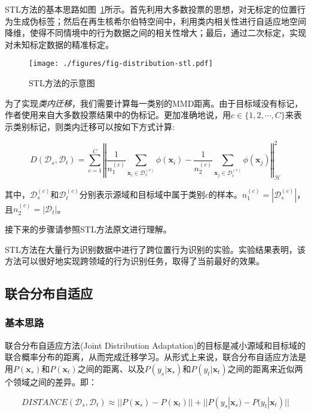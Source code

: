 STL方法的基本思路如图~\ref{fig-distribution-stl}所示。首先利用大多数投票的思想，对无标定的位置行为生成伪标签；然后在再生核希尔伯特空间中，利用类内相关性进行自适应地空间降维，使得不同情境中的行为数据之间的相关性增大；最后，通过二次标定，实现对未知标定数据的精准标定。

\begin{figure}[htbp]
	\centering
	\texttt{[image: ./figures/fig-distribution-stl.pdf]}
	\caption{STL方法的示意图}
	\label{fig-distribution-stl}
\end{figure}

为了实现\textit{类内迁移}，我们需要计算每一类别的MMD距离。由于目标域没有标记，作者使用来自大多数投票结果中的伪标记。更加准确地说，用$c \in \{1, 2, \cdots, C\}$来表示类别标记，则类内迁移可以按如下方式计算:

\begin{equation}
\label{equ-stl-stra}
D(\mathcal{D}_{s},\mathcal{D}_{t})
=\sum_{c=1}^{C}\left \Vert \frac{1}{n^{(c)}_1} \sum_{\mathbf{x}_i \in \mathcal{D}^{(c)}_s} \phi(\mathbf{x}_i) - \frac{1}{n^{(c)}_2} \sum_{\mathbf{x}_j \in \mathcal{D}^{(c)}_t} \phi(\mathbf{x}_j) \right \Vert ^2_\mathcal{H}
\end{equation}

其中，$\mathcal{D}^{(c)}_s$和$\mathcal{D}^{(c)}_t$分别表示源域和目标域中属于类别$c$的样本。$n^{(c)}_1=|\mathcal{D}^{(c)}_s|$，且$n^{(c)}_2=|\mathcal{D}_t|$。

接下来的步骤请参照STL方法原文进行理解。

STL方法在大量行为识别数据中进行了跨位置行为识别的实验。实验结果表明，该方法可以很好地实现跨领域的行为识别任务，取得了当前最好的效果。

\subsection{联合分布自适应}

\subsubsection{基本思路}

联合分布自适应方法(Joint Distribution Adaptation)的目标是减小源域和目标域的联合概率分布的距离，从而完成迁移学习。从形式上来说，联合分布自适应方法是用$P(\mathbf{x}_s)$和$P(\mathbf{x}_t)$之间的距离、以及$P(y_s|\mathbf{x}_s)$和$P(y_t|\mathbf{x}_t)$之间的距离来近似两个领域之间的差异。即：

\begin{equation}
\label{eq-joint-general}
DISTANCE(\mathcal{D}_s,\mathcal{D}_t) \approx ||P(\mathbf{x}_s) - P(\mathbf{x}_t)|| + ||P(y_s|\mathbf{x}_s) - P(y_t|\mathbf{x}_t)||
\end{equation}

